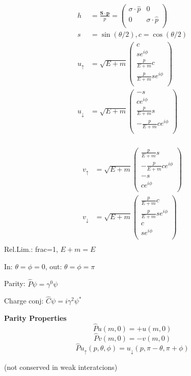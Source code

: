 \begin{multicols}{2}
    \begin{align*}
        h &= \frac{\mathbf{S} \cdot \mathbf{p}}{p} = \begin{pmatrix}
            \sigma \cdot \hat{p} & 0 \\
            0 & \sigma \cdot \hat{p} \\
        \end{pmatrix}\\
        s &= \sin(\theta/2), c=\cos(\theta/2)\\
        u_\uparrow &= \sqrt{E+m} \begin{pmatrix}
            c \\
            se^{i\phi} \\
            \frac{p}{E+m}c \\
            \frac{p}{E+m}se^{i\phi} \\
        \end{pmatrix}\\
        u_\downarrow &= \sqrt{E+m} \begin{pmatrix}
            -s \\
            ce^{i\phi} \\
            \frac{p}{E+m}s \\
            -\frac{p}{E+m}ce^{i\phi} \\
        \end{pmatrix}\\
    \end{align*}

    \begin{align*}
        v_\uparrow &= \sqrt{E+m} \begin{pmatrix}
            \frac{p}{E+m}s \\
            -\frac{p}{E+m}ce^{i\phi} \\
            -s \\
            ce^{i\phi} \\
        \end{pmatrix}\\
        v_\downarrow &= \sqrt{E+m} \begin{pmatrix}
            \frac{p}{E+m}c \\
            \frac{p}{E+m}se^{i\phi} \\
            c \\
            se^{i\phi} \\
        \end{pmatrix}\\
    \end{align*}
    Rel.Lim.: frac=1, $E+m=E$

    In: $\theta=\phi=0$, out: $\theta=\phi=\pi$

    Parity: $\hat{P}\psi = \gamma^0\psi$

    Charge conj: $\hat{C}\psi = i\gamma^2\psi^*$
\end{multicols}


\textbf{Parity Properties}
$$\hat{P}u(m,0) = +u(m,0)$$
$$\hat{P}v(m,0) = -v(m,0)$$
$$\hat{P}u_\uparrow(p,\theta,\phi) = u_\downarrow(p,\pi-\theta,\pi+\phi)$$

(not conserved in weak interatcions)

